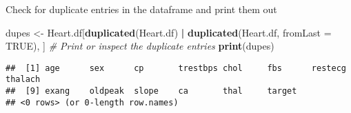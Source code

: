 \documentclass[
]{article}
\newenvironment{Shaded}{\begin{snugshade}}{\end{snugshade}}
\newcommand{\AttributeTok}[1]{\textcolor[rgb]{0.13,0.29,0.53}{#1}}
\newcommand{\CommentTok}[1]{\textcolor[rgb]{0.56,0.35,0.01}{\textit{#1}}}
\newcommand{\ConstantTok}[1]{\textcolor[rgb]{0.56,0.35,0.01}{#1}}
\newcommand{\FunctionTok}[1]{\textcolor[rgb]{0.13,0.29,0.53}{\textbf{#1}}}
\newcommand{\NormalTok}[1]{#1}
\newcommand{\OtherTok}[1]{\textcolor[rgb]{0.56,0.35,0.01}{#1}}
\newcommand{\SpecialCharTok}[1]{\textcolor[rgb]{0.81,0.36,0.00}{\textbf{#1}}}
\newcommand{\StringTok}[1]{\textcolor[rgb]{0.31,0.60,0.02}{#1}}
\begin{document}
\begin{Shaded}
\end{Shaded}

Check for duplicate entries in the dataframe and print them out

\begin{Shaded}
\begin{Highlighting}[]
\NormalTok{dupes }\OtherTok{\textless{}{-}}\NormalTok{ Heart.df[}\FunctionTok{duplicated}\NormalTok{(Heart.df) }\SpecialCharTok{|} \FunctionTok{duplicated}\NormalTok{(Heart.df, }\AttributeTok{fromLast =} \ConstantTok{TRUE}\NormalTok{), ]}
\CommentTok{\# Print or inspect the duplicate entries}
\FunctionTok{print}\NormalTok{(dupes)}
\end{Highlighting}
\end{Shaded}

\begin{verbatim}
##  [1] age      sex      cp       trestbps chol     fbs      restecg  thalach 
##  [9] exang    oldpeak  slope    ca       thal     target  
## <0 rows> (or 0-length row.names)
\end{verbatim}
\end{document}
